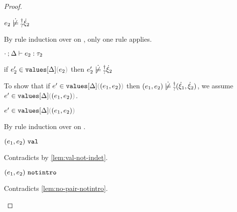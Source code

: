 \begin{proof}
\begin{byCases}
\begin{byCases}
\begin{byCases}
\begin{byCases}
          \begin{pfsteps*}
          \item $\cnotsatisfyormay{e_2}{\hxi_2}$  
          \end{pfsteps*}
          By rule induction over  on , only one rule applies.
          \begin{byCases}
            \item[\text{(\ref{rule:TPair})}]
            \begin{pfsteps*}
            \item $\cdot \mathbin{;} \Delta \vdash e_2 : \tau_2$  
            \item if $\inValues{e_2'}{\Delta}{e_2}$ then $\cnotsatisfyormay{e_2'}{\hxi_2}$  
            \end{pfsteps*} 
            To show that if $\inValues{e'}{\Delta}{\hpair{e_1}{e_2}}$ then $\cnotsatisfyormay{\hpair{e_1}{e_2}}{\cpair{\hxi_1}{\hxi_2}}$, we assume $\inValues{e'}{\Delta}{\hpair{e_1}{e_2}}$.
            \begin{pfsteps*}
            \item $\inValues{e'}{\Delta}{\hpair{e_1}{e_2}}$  
            \end{pfsteps*}
            By rule induction over  on .
            \begin{byCases}
              \item[\text{(\ref{rule:IVVal})}]
              \begin{pfsteps*}
              \item $(e_1 , e_2) ~\mathtt{val}$ 
              \end{pfsteps*} 
              Contradicts  by \autoref{lem:val-not-indet}.
              \item[\text{(\ref{rule:IVIndet})}] 
              \begin{pfsteps*}
              \item $(e_1 , e_2) ~\mathtt{notintro}$ 
              \end{pfsteps*}
              Contradicts \autoref{lem:no-pair-notintro}.
              \item[\text{(\ref{rule:IVPair})}]

\end{byCases}
\end{byCases}
\end{byCases}
\end{byCases}
\end{byCases}
\end{byCases}
\end{proof}
